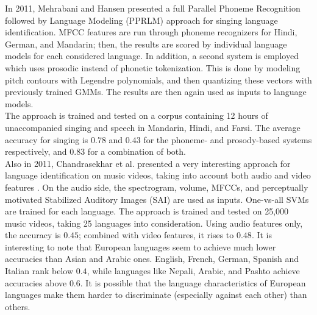 In 2011, Mehrabani and Hansen presented a full Parallel Phoneme Recognition followed by Language Modeling (PPRLM) approach for singing language identification. MFCC features are run through phoneme recognizers for Hindi, German, and Mandarin; then, the results are scored by individual language models for each considered language. In addition, a second system is employed which uses prosodic instead of phonetic tokenization. This is done by modeling pitch contours with Legendre polynomials, and then quantizing these vectors with previously trained GMMs. The results are then again used as inputs to language models.\\
The approach is trained and tested on a corpus containing 12 hours of unaccompanied singing and speech in Mandarin, Hindi, and Farsi. The average accuracy for singing is $0.78$ and $0.43$ for the phoneme- and prosody-based systems respectively, and $0.83$ for a combination of both.\\

Also in 2011, Chandrasekhar et al. presented a very interesting approach for language identification on music videos, taking into account both audio and video features \cite {chandrasekhar}. On the audio side, the spectrogram, volume, MFCCs, and perceptually motivated Stabilized Auditory Images (SAI) are used as inputs. One-vs-all SVMs are trained for each language. The approach is trained and tested on 25,000 music videos, taking 25 languages into consideration. Using audio features only, the accuracy is $0.45$; combined with video features, it rises to $0.48$. It is interesting to note that European languages seem to achieve much lower accuracies than Asian and Arabic ones. English, French, German, Spanish and Italian rank below $0.4$, while languages like Nepali, Arabic, and Pashto achieve accuracies above $0.6$. It is possible that the language characteristics of European languages make them harder to discriminate (especially against each other) than others.


